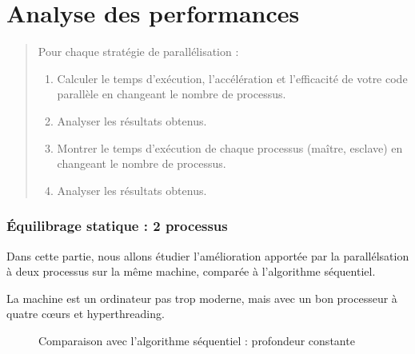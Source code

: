 \section{Analyse des performances}

\question
\label{mandel:q:4}

\begin{quotation}
  Pour chaque stratégie de parallélisation :

  \begin{enumerate}
  \item Calculer le temps d'exécution, l'accélération et l'efficacité
    de votre code parallèle en changeant le nombre de processus.
  \item Analyser les résultats obtenus.
  \item Montrer le temps d'exécution de chaque processus (maître,
    esclave) en changeant le nom\-bre de processus.
  \item Analyser les résultats obtenus.
  \end{enumerate}
\end{quotation}

\subsubsection{Équilibrage statique : 2 processus}

Dans cette partie, nous allons étudier l'amélioration apportée par la
parallélsation à deux processus sur la même machine, comparée à
l'algorithme séquentiel.

La machine est un ordinateur pas trop moderne, mais avec un bon
processeur à quatre cœurs et hyperthreading.

\begin{figure}
  \centering


  \caption{Comparaison avec l'algorithme séquentiel : profondeur
    constante}
  \label{fig:mandel:stat:comp-seq-taille}
\end{figure}

